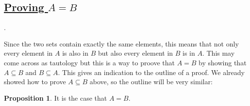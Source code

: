 \documentclass{amsart} %
\theoremstyle{definition} %
\theoremstyle{proposition} %
\newtheorem*{prpn}{Proposition}
\theoremstyle{remark} %
\begin{document}
\bigskip \bigskip \bigskip \bigskip

\subsection{\underline{Proving $A = B$}}.

\noindent Since the two sets contain exactly the same elements, this means that not only every element in $A$ is also in $B$ but also every element in $B$ is in $A$. This may come across as tautology but this is a way to proove that $A = B$ by showing that $A \subseteq B$ and $B \subseteq A$. This gives an indication to the outline of a proof. We already showed how to prove $A \subseteq B$ above, so the outline will be very similar:

\begin{prpn}
      It is the case that $A = B$.
\end{prpn}
\end{document}

